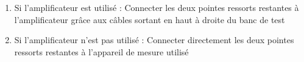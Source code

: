 \begin{enumerate}
          
    \item Si l'amplificateur est utilisé : Connecter les deux pointes ressorts restantes à l'amplificateur grâce aux câbles sortant en haut
          à droite du banc de test\\
          
    \item Si l'amplificateur n'est pas utilisé : Connecter directement les deux pointes ressorts restantes à l'appareil de mesure utilisé
\end{enumerate}
